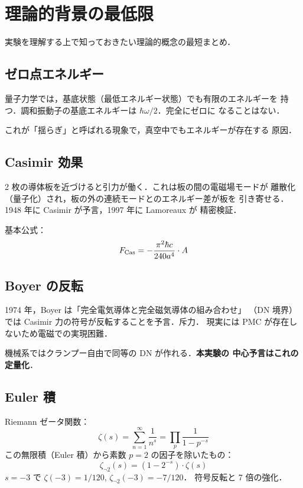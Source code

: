 \documentclass[11pt,a4paper]{article}
\begin{document}
\section{理論的背景の最低限}

実験を理解する上で知っておきたい理論的概念の最短まとめ．

\subsection{ゼロ点エネルギー}

量子力学では，基底状態（最低エネルギー状態）でも有限のエネルギーを
持つ．調和振動子の基底エネルギーは $\hbar\omega/2$．完全にゼロに
なることはない．

これが「揺らぎ」と呼ばれる現象で，真空中でもエネルギーが存在する
原因．

\subsection{Casimir 効果}

2 枚の導体板を近づけると引力が働く．これは板の間の電磁場モードが
離散化（量子化）され，板の外の連続モードとのエネルギー差が板を
引き寄せる．1948 年に Casimir が予言，1997 年に Lamoreaux が
精密検証．

基本公式：
\begin{equation}
F_{\rm Cas} = -\frac{\pi^2 \hbar c}{240 a^4} \cdot A
\end{equation}

\subsection{Boyer の反転}

1974 年，Boyer は「完全電気導体と完全磁気導体の組み合わせ」
（DN 境界）では Casimir 力の符号が反転することを予言．斥力．
現実には PMC が存在しないため電磁での実現困難．

機械系ではクランプー自由で同等の DN が作れる．\textbf{本実験の
中心予言はこれの定量化}．

\subsection{Euler 積}

Riemann ゼータ関数：
\begin{equation}
\zeta(s) = \sum_{n=1}^\infty \frac{1}{n^s} = \prod_p \frac{1}{1 - p^{-s}}
\end{equation}
この無限積（Euler 積）から素数 $p=2$ の因子を除いたもの：
\begin{equation}
\zeta_{\neg 2}(s) = (1 - 2^{-s})\cdot\zeta(s)
\end{equation}
$s = -3$ で $\zeta(-3) = 1/120$, $\zeta_{\neg 2}(-3) = -7/120$．
符号反転と 7 倍の強化．
\end{document}
